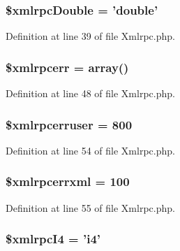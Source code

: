 \subsubsection[{\$xmlrpc\-Double}]{\setlength{\rightskip}{0pt plus 5cm}\$xmlrpc\-Double = 'double'}\label{class_c_i___xmlrpc_aa412c6bea7572d0e508b5ef9d2213db3}


Definition at line 39 of file Xmlrpc.\-php.

\subsubsection[{\$xmlrpcerr}]{\setlength{\rightskip}{0pt plus 5cm}\$xmlrpcerr = array()}\label{class_c_i___xmlrpc_a915a90a791db11a94f665567d2f5ad01}


Definition at line 48 of file Xmlrpc.\-php.

\subsubsection[{\$xmlrpcerruser}]{\setlength{\rightskip}{0pt plus 5cm}\$xmlrpcerruser = 800}\label{class_c_i___xmlrpc_a45bf41f1e861f94e04f463a638e5abf5}


Definition at line 54 of file Xmlrpc.\-php.

\subsubsection[{\$xmlrpcerrxml}]{\setlength{\rightskip}{0pt plus 5cm}\$xmlrpcerrxml = 100}\label{class_c_i___xmlrpc_af2500be600bfad88988409e6ff64c01c}


Definition at line 55 of file Xmlrpc.\-php.

\subsubsection[{\$xmlrpc\-I4}]{\setlength{\rightskip}{0pt plus 5cm}\$xmlrpc\-I4 = 'i4'}\label{class_c_i___xmlrpc_a4d41d61a02c60406c56254f0988b8141}


